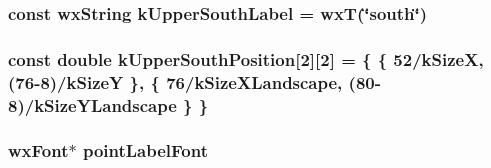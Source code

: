 \hypertarget{a00222_afea558671b142a7362d642a399cb689e}{
\subsubsection[{k\-Upper\-South\-Label}]{\setlength{\rightskip}{0pt plus 5cm}const wx\-String k\-Upper\-South\-Label = wx\-T(\char`\"{}south\char`\"{})\hspace{0.3cm}{\ttfamily [static]}}}\label{a00222_afea558671b142a7362d642a399cb689e}
\hypertarget{a00222_aaf67580aa2e3a063aa22f2d1155ba03d}{
\subsubsection[{k\-Upper\-South\-Position}]{\setlength{\rightskip}{0pt plus 5cm}const double k\-Upper\-South\-Position\mbox{[}2\mbox{]}\mbox{[}2\mbox{]} = \{ \{ 52/{\bf k\-Size\-X}, (76-\/8)/{\bf k\-Size\-Y} \}, \{ 76/{\bf k\-Size\-X\-Landscape}, (80-\/8)/{\bf k\-Size\-Y\-Landscape} \} \}\hspace{0.3cm}{\ttfamily [static]}}}\label{a00222_aaf67580aa2e3a063aa22f2d1155ba03d}
\hypertarget{a00222_aeaf4f1bd9c0b23a531be01a5bf2ae4e6}{
\subsubsection[{point\-Label\-Font}]{\setlength{\rightskip}{0pt plus 5cm}wx\-Font$\ast$ point\-Label\-Font}}\label{a00222_aeaf4f1bd9c0b23a531be01a5bf2ae4e6}
